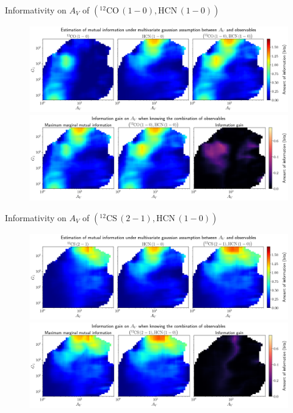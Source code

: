 \documentclass{beamer}
\begin{document}
\begin{frame}{Informativity on $A_V$ of $\left(\mathrm{^{12}CO\,(1-0)},\mathrm{HCN\,(1-0)}\right)$}
    \begin{figure}
        \centering
        \includegraphics[width=0.95\linewidth]{../linearinfo/av__12co10_hcn10_linearinfo.png}
        \vfill
        \includegraphics[width=0.95\linewidth]{../linearinfo/av__12co10_hcn10_linearinfo_gain.png}
    \end{figure}
\end{frame}

\begin{frame}{Informativity on $A_V$ of $\left(\mathrm{^{12}CS\,(2-1)},\mathrm{HCN\,(1-0)}\right)$}
    \begin{figure}
        \centering
        \includegraphics[width=0.95\linewidth]{../linearinfo/av__12cs21_hcn10_linearinfo.png}
        \vfill
        \includegraphics[width=0.95\linewidth]{../linearinfo/av__12cs21_hcn10_linearinfo_gain.png}
    \end{figure}
\end{frame}
\end{document}
